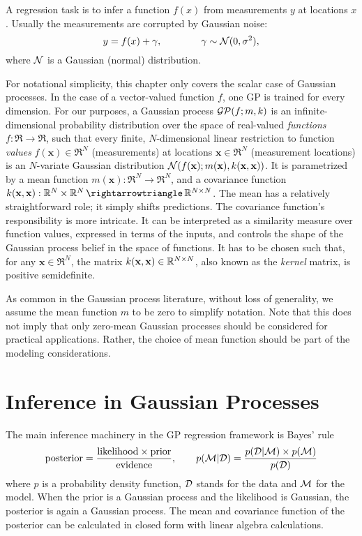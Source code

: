 A regression task is to infer a function $f(x)$ from measurements $y$ at
locations $x$. Usually the measurements are corrupted by Gaussian noise:
\begin{equation}
  y = f(x) + \gamma, \qquad\qquad \gamma \sim \mathcal{N}(0,\sigma^2),
\end{equation}
where $\mathcal{N}$ is a Gaussian (normal) distribution.

For notational simplicity, this chapter only covers the scalar case of Gaussian
processes. In the case of a vector-valued function $f$, one GP is trained for
every dimension. For our purposes, a Gaussian process $\mathcal{GP}(f;m,k)$ is an
infinite-dimensional probability distribution over the space of real-valued
\emph{functions} $f:\Re\to\Re$, such that every finite, $N$-dimensional linear
restriction to function \emph{values} $f(\mathbf{x})\in \Re^N$ (measurements)
at locations $\mathbf{x}\in\Re^N$ (measurement locations) is an $N$-variate
Gaussian distribution $\mathcal{N}(f(\mathbf{x}); m(\mathbf{x}),
k(\mathbf{x},\mathbf{x}))$. It is parametrized by a mean function
$m(\mathbf{x}):\Re^N\to\Re^N$, and a covariance function
$\k(\mathbf{x},\mathbf{x}):\Re^N \times \Re^N\to \Re^{N\times N}$. The mean has
a relatively straightforward role; it simply shifts predictions. The covariance
function's responsibility is more intricate. It can be interpreted as a
similarity measure over function values, expressed in terms of the inputs, and
controls the shape of the Gaussian process belief in the space of functions. It
has to be chosen such that, for any $\mathbf{x}\in\Re^N$, the matrix
$k(\mathbf{x},\mathbf{x}) \in \mathbb{R}^{N\times N}$, also known as the
\emph{kernel} matrix, is positive semidefinite.

As common in the Gaussian process literature, without loss of generality, we
assume the mean function $m$ to be zero to simplify notation. Note that this
does not imply that only zero-mean Gaussian processes should be considered for
practical applications. Rather, the choice of mean function should be part of
the modeling considerations.

\section{Inference in Gaussian Processes}

The main inference machinery in the GP regression framework is Bayes' rule
\begin{equation*}
  \text{posterior} = \frac{\text{likelihood} \times
\text{prior}}{\text{evidence}},
\qquad
  p(\mathcal{M}|\mathcal{D}) = \frac{p(\mathcal{D}|\mathcal{M}) \times p(\mathcal{M})}{p(\mathcal{D})}
\end{equation*}
where $p$ is a probability density function, $\mathcal{D}$ stands for the data and $\mathcal{M}$
for the model. When the prior is a Gaussian process and the likelihood is
Gaussian, the posterior is again a Gaussian process. The mean and covariance
function of the posterior can be calculated in closed form with linear algebra
calculations.

